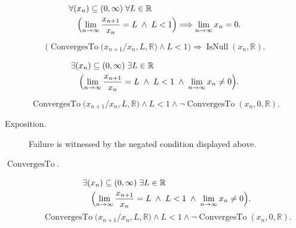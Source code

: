 \begin{remark*}
\[
\begin{aligned}
&\forall (x_n)\subseteq (0,\infty)\;\forall L\in\mathbb{R}\\
&\quad\Bigl(
    \lim_{n\to\infty}\frac{x_{n+1}}{x_n}=L
    \;\land\;
    L<1
\Bigr)
\Longrightarrow
\lim_{n\to\infty}x_n=0.
\end{aligned}
\]
\end{remark*}

\begin{remark*}
\[
\bigl(
\operatorname{ConvergesTo}\bigl(x_{n+1}/x_n,L,\mathbb{R}\bigr)
\land
L<1
\bigr)
\Longrightarrow
\operatorname{IsNull}(x_n,\mathbb{R}).
\]
\end{remark*}

\begin{remark*}
\[
\begin{aligned}
&\exists (x_n)\subseteq (0,\infty)\;\exists L\in\mathbb{R}\\
&\quad\Bigl(
    \lim_{n\to\infty}\frac{x_{n+1}}{x_n}=L
    \;\land\;
    L<1
    \;\land\;
    \lim_{n\to\infty}x_n\neq 0
\Bigr).
\end{aligned}
\]
\end{remark*}

\begin{remark*}
\[
\operatorname{ConvergesTo}\bigl(x_{n+1}/x_n,L,\mathbb{R}\bigr)
\land
L<1
\land
\neg\operatorname{ConvergesTo}(x_n,0,\mathbb{R}).
\]
\end{remark*}
\begin{remark*}
\begin{description}
  \item[Exposition.]
Failure is witnessed by the negated condition displayed above.
  \item[\(\operatorname{ConvergesTo}.\)]
\[
\begin{aligned}
&\exists (x_n)\subseteq (0,\infty)\;\exists L\in\mathbb{R}\\
&\quad\Bigl(
    \lim_{n\to\infty}\frac{x_{n+1}}{x_n}=L
    \;\land\;
    L<1
    \;\land\;
    \lim_{n\to\infty}x_n\neq 0
\Bigr).
\end{aligned}
\]
\[
\operatorname{ConvergesTo}\bigl(x_{n+1}/x_n,L,\mathbb{R}\bigr)
\land
L<1
\land
\neg\operatorname{ConvergesTo}(x_n,0,\mathbb{R}).
\]
\end{description}
\end{remark*}

